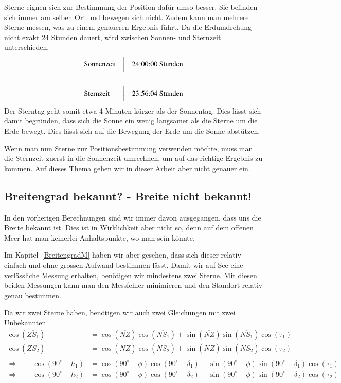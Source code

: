 \begin{refsection}
Sterne eignen sich zur Bestimmung der Position dafür umso besser. Sie befinden sich immer am selben Ort und bewegen sich nicht. Zudem kann man mehrere Sterne messen, was zu einem genaueren Ergebnis führt. Da die Erdumdrehung nicht exakt 24 Stunden dauert, wird zwischen Sonnen- und Sternzeit unterschieden.
\[
\begin{aligned}
&\text{Sonnenzeit}
&
&\text{\bigg \vert}
&
&\text{24:00:00 Stunden}
\\
\\
&\text{Sternzeit}
&
&\text{\bigg \vert}
&
&\text{23:56:04 Stunden}
\end{aligned}
\]
Der Sterntag geht somit etwa 4 Minuten kürzer als der Sonnentag. Dies lässt sich damit begründen, dass sich die Sonne ein wenig langsamer als die Sterne um die Erde bewegt. Dies lässt sich auf die Bewegung der Erde um die Sonne abstützen.

Wenn man nun Sterne zur Positionsbestimmung verwenden möchte, muss man die Sternzeit zuerst in die Sonnenzeit umrechnen, um auf das richtige Ergebnis zu kommen. Auf dieses Thema gehen wir in dieser Arbeit aber nicht genauer ein.


\subsection{Breitengrad bekannt? - Breite nicht bekannt!}
In den vorherigen Berechnungen sind wir immer davon ausgegangen, dass uns die Breite bekannt ist. Dies ist in Wirklichkeit aber nicht so, denn auf dem offenen Meer hat man keinerlei Anhaltspunkte, wo man sein könnte.

Im Kapitel~\ref{BreitengradM}  haben wir aber gesehen, dass sich dieser relativ einfach und ohne grossen Aufwand bestimmen lässt. Damit wir auf See eine verlässliche Messung erhalten, benötigen wir mindestens zwei Sterne. Mit diesen beiden Messungen kann man den Messfehler minimieren und den Standort relativ genau bestimmen.

Da wir zwei Sterne haben, benötigen wir auch zwei Gleichungen mit zwei Unbekannten
\begin{align*}
\cos(\overline{ZS_1}) &= \cos(\overline{NZ}) \cos(\overline{NS_1}) + \sin(\overline{NZ}) \sin(\overline{NS_1}) \cos(\tau_1) \\
\cos(\overline{ZS_2}) &= \cos(\overline{NZ}) \cos(\overline{NS_2}) + \sin(\overline{NZ}) \sin(\overline{NS_2}) \cos(\tau_2) \\
\\
\Rightarrow \quad \quad
\cos(90^{\circ} - h_1) &= \cos(90^{\circ} - \phi) \cos(90^{\circ} - \delta_1) + \sin(90^{\circ} - \phi)\sin(90^{\circ} - \delta_1) \cos(\tau_1) \\
\Rightarrow \quad \quad
\cos(90^{\circ} - h_2) &= \cos(90^{\circ} - \phi) \cos(90^{\circ} - \delta_2) + \sin(90^{\circ} - \phi)\sin(90^{\circ} - \delta_2) \cos(\tau_2)
\end{align*}


\end{refsection}
